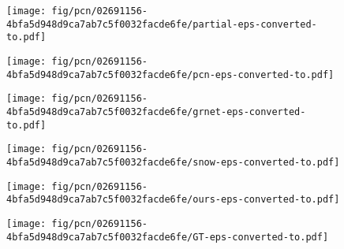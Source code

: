\begin{figure*}[t]
	\newlength{\sunit}
	\setlength{\sunit}{0.165\linewidth}
	\newlength{\sunita}
	\setlength{\sunita}{0.15\linewidth}
	\newlength{\sunitb}
	\setlength{\sunitb}{0.09\linewidth}
	\newlength{\sunitc}
	\setlength{\sunitc}{0.12\linewidth}
	\newlength{\sunitd}
	\setlength{\sunitd}{0.12\linewidth}
	
	\centering
	
	\begin{subfigure}{\sunit}
		\centering
		\texttt{[image: fig/pcn/02691156-4bfa5d948d9ca7ab7c5f0032facde6fe/partial-eps-converted-to.pdf]}
	\end{subfigure}\hfill \begin{subfigure}{\sunit}
		\centering
		\texttt{[image: fig/pcn/02691156-4bfa5d948d9ca7ab7c5f0032facde6fe/pcn-eps-converted-to.pdf]}
	\end{subfigure}\hfill \begin{subfigure}{\sunit}
		\centering
		\texttt{[image: fig/pcn/02691156-4bfa5d948d9ca7ab7c5f0032facde6fe/grnet-eps-converted-to.pdf]}
	\end{subfigure}\hfill \begin{subfigure}{\sunit}
		\centering
		\texttt{[image: fig/pcn/02691156-4bfa5d948d9ca7ab7c5f0032facde6fe/snow-eps-converted-to.pdf]}
	\end{subfigure}\hfill \begin{subfigure}{\sunit}
		\centering
		\texttt{[image: fig/pcn/02691156-4bfa5d948d9ca7ab7c5f0032facde6fe/ours-eps-converted-to.pdf]}
	\end{subfigure}\hfill \begin{subfigure}{\sunit}
		\centering
		\texttt{[image: fig/pcn/02691156-4bfa5d948d9ca7ab7c5f0032facde6fe/GT-eps-converted-to.pdf]}
	\end{subfigure}


\end{figure*}
